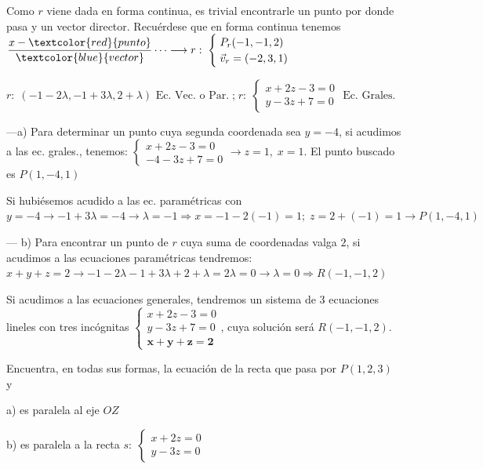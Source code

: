 \begin{proofw}\renewcommand{\qedsymbol}{$\diamond$}
	Como $r$ viene dada en forma continua, es trivial encontrarle un punto por donde pasa y un vector director. Recuérdese que en forma continua tenemos $\dfrac {x-\textcolor{red}{punto}}{\textcolor{blue}{vector}} \cdots  \longrightarrow r:\; \begin{cases} \; P_r(-1,-1,2) \\ \; \vec v_r=(-2,3,1) \end{cases}$
	
\noindent \small{$r:\;(-1-2\lambda, -1+3\lambda, 2+\lambda)\text{ Ec. Vec. o Par.}\;$;$\;r:\; \begin{cases} x+2z-3=0\\y-3z+7=0 \end{cases} \text{ Ec. Grales}$}\normalsize{.}
	
\noindent ---a) Para determinar un punto cuya segunda coordenada sea $y=-4$, si acudimos a las ec. grales., tenemos: $\begin{cases} x+2z-3=0\\-4-3z+7=0 \end{cases} \to z=1,\; x=1$. El punto buscado es $P(1,-4,1)$

\noindent Si hubiésemos acudido a las ec. paramétricas con $y=-4 \to -1+3\lambda=-4 \to \lambda =-1 \Rightarrow x=-1-2(-1)=1;\; z=2+(-1)=1 \to P(1,-4,1)$

\noindent --- b) Para encontrar un punto de $r$ cuya suma de coordenadas valga $2$, si acudimos a las ecuaciones paramétricas tendremos:
 $x+y+z=2  \to -1-2\lambda -1+3\lambda +2+\lambda = 2\lambda =0 \to \lambda =0 \Rightarrow R(-1,-1,2)$
 
\noindent Si acudimos a las ecuaciones generales, tendremos un sistema de 3 ecuaciones lineles con tres incógnitas  $\begin{cases} x+2z-3=0\\y-3z+7=0 \\ \boldsymbol{x+y+z=2} \end{cases} $, cuya solución será $ R(-1,-1,2)$.
\end{proofw}



\begin{ejre}
	Encuentra, en todas sus formas, la ecuación de la recta que pasa por $P(1,2,3)$ y 
	
	a) es paralela al eje $OZ$
	
	b) es paralela a la recta $s:\; \begin{cases} x+2z=0\\y-3z=0 \end{cases}$
\end{ejre}

